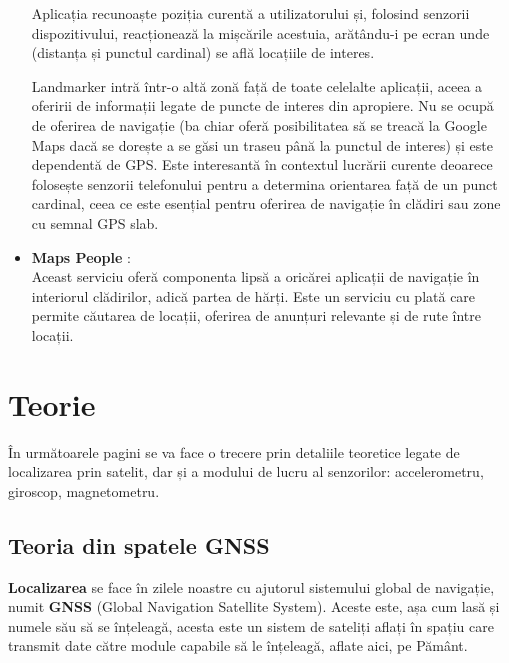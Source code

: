 \documentclass[12pt,a4paper]{article}
\begin{document}
\begin{itemize}
Aplicația recunoaște poziția curentă a utilizatorului și, folosind senzorii dispozitivului, reacționează la mișcările acestuia, arătându-i pe ecran unde (distanța și punctul cardinal) se află locațiile de interes.

Landmarker intră într-o altă zonă față de toate celelalte aplicații, aceea a oferirii de informații legate de puncte de interes din apropiere. Nu se ocupă de oferirea de navigație (ba chiar oferă posibilitatea să se treacă la Google Maps dacă se dorește a se găsi un traseu până la punctul de interes) și este dependentă de GPS. Este interesantă în contextul lucrării curente deoarece folosește senzorii telefonului pentru a determina orientarea față de un punct cardinal, ceea ce este esențial pentru oferirea de navigație în clădiri sau zone cu semnal GPS slab.

\item \textbf{Maps People} \cite{MapsPeople}:\\
Aceast serviciu oferă componenta lipsă a oricărei aplicații de navigație în interiorul clădirilor, adică partea de hărți. Este un serviciu cu plată care permite căutarea de locații, oferirea de anunțuri relevante și de rute între locații.

\end{itemize}

\newpage



\section{Teorie} \label{Teorie}

În următoarele pagini se va face o trecere prin detaliile teoretice legate de localizarea prin satelit, dar și a modului de lucru al senzorilor: accelerometru, giroscop, magnetometru.

\subsection{Teoria din spatele GNSS}
\textbf{Localizarea} se face în zilele noastre cu ajutorul sistemului global de navigație, numit \textbf{GNSS} (Global Navigation Satellite System). Aceste este, așa cum lasă și numele său să se înțeleagă, acesta este un sistem de sateliți aflați în spațiu care transmit date către module capabile să le înțeleagă, aflate aici, pe Pământ.
\end{document}
